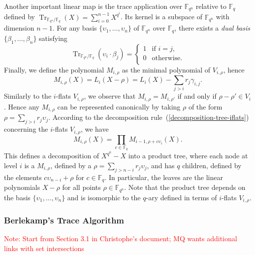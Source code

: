 \documentclass{article}
\newcommand{\ff}[1]{\mathbb{F}_{#1}}
\newcommand{\qq}{q}
\newcommand{\nn}{n}
\newcommand{\qn}{{\qq^\nn}}
\newcommand{\basef}{\ff{\qq}}
\newcommand{\extf}{\ff{\qn}}
\DeclareMathOperator{\Tr}{Tr}
\newcommand{\Notes}[1]{\textcolor{red}{Note: #1}}
\begin{document}
Another important linear map is the trace application over $\extf$ relative to $\basef$ defined by $\Tr_{\extf/\basef}(X)=\sum_{i=0}^{n-1} X^{\qq^i}$. Its kernel is a subspace of $\extf$ with dimension $n-1$. For any basis $\{\upsilon_1,\ldots,\upsilon_\nn\}$ of $\extf$ over $\basef$, there exists a \emph{dual basis} $\{\beta_1,\ldots,\beta_\nn\}$ satisfying  
$$
\Tr_{\extf/\basef}(\upsilon_i \cdot \beta_j)=
\left\{
\begin{array}{ll}
1 & \mbox{if } i=j, \\
0 &  \mbox{otherwise}. \\
\end{array}
\right.
$$
Finally, we define the polynomial $M_{i,\rho}$ as the minimal
polynomial of $V_{i,\rho}$, hence
\begin{equation}
  M_{i,\rho}(X) = L_i(X - \rho) = L_i(X) - \sum_{j>i}r_j\gamma_{i,j}.
\end{equation}
Similarly to the $i$-flats $V_{i,\rho}$, we observe that $M_{i,\rho}=M_{i,\rho'}$ if and only if $\rho-\rho'\in V_i$. Hence
any $M_{i,\rho}$ can be represented canonically by taking $\rho$ of
the form $\rho=\sum_{j>i}r_j\upsilon_j$. According to the decomposition rule~(\ref{decomposition-tree-iflats}) concerning the $i$-flats $V_{i,\rho}$, we have
\begin{equation}
\label{node_product}
  M_{i,\rho}(X) = \prod_{c\in\basef} M_{i-1,\rho+c\upsilon_i}(X).
\end{equation}
This defines a decomposition of $X^{\qn}-X$ into a product tree, where
each node at level $i$ is a $M_{i,\rho}$, defined by a
$\rho=\sum_{j>n-i}r_j\upsilon_j$, and has $\qq$ children, defined by
the elements $c\upsilon_{n-i}+\rho$ for $c\in\basef$. In particular,
the leaves are the linear polynomials $X-\rho$ for all points
$\rho\in\extf$.
%
Note that the product tree depends on the basis $\{\upsilon_1,\ldots,\upsilon_\nn\}$ and is isomorphic to the $q$-ary defined in terms of $i$-flats $V_{i,\rho}$.











\subsubsection{Berlekamp's Trace Algorithm}
\label{sec:BTA}
\Notes{Start from Section 3.1 in Christophe's document; MQ wants additional links with set intersections}
\end{document}
